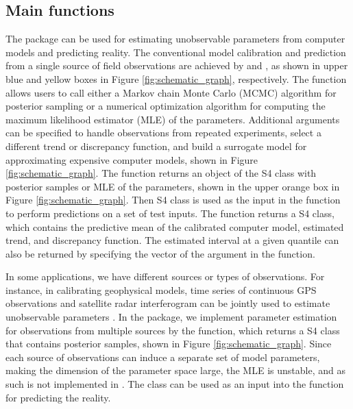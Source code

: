 \subsection{Main functions}
The   package can be used for estimating unobservable parameters from computer models and  predicting reality. The conventional model calibration and prediction from a single source of field observations are achieved by  and , as shown in upper blue and  yellow boxes in Figure \ref{fig:schematic_graph}, respectively. The function  allows users to call {either} a Markov chain Monte Carlo (MCMC) algorithm for posterior sampling or a numerical optimization algorithm for computing the maximum likelihood estimator (MLE)  of the parameters. Additional arguments can be specified to handle observations from repeated experiments, select a different trend or discrepancy function, and build a surrogate model for approximating  expensive computer models, shown in  Figure \ref{fig:schematic_graph}.
 The  function returns an object
of the  S4 class with posterior samples or MLE of the parameters, {shown in the upper orange box in Figure \ref{fig:schematic_graph}}. 
Then  S4 class is used as the input in the  function to perform predictions on a set of test inputs. The   function returns  a  S4 class, which contains the predictive mean of the calibrated computer model,  estimated trend, and  discrepancy function. The estimated interval at a given quantile can also be returned by specifying the vector of the  argument in the  function.  
 
  In some applications, we have different sources or types of observations. For instance, in calibrating geophysical models, time series of continuous GPS observations and satellite radar interferogram can be jointly used  to estimate unobservable parameters \citep{anderson2019magma}. 
  In the  package, we implement parameter estimation for observations from multiple sources by the  function, which returns a   S4 class that contains posterior samples, shown in Figure \ref{fig:schematic_graph}. {Since each source of observations can induce a separate set of model parameters, making the dimension of the parameter space large, the MLE is unstable, and as such is not implemented in .} The  class can be used as an input into the  function for predicting the reality. 
  
